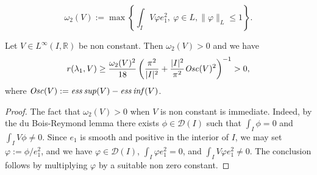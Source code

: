 \documentclass[10pt,a4paper]{amsart}
\newcommand{\R}{\mathbb{R}}
\begin{document}
\begin{equation}\label{eq:defomega2}
	\omega_2(V) := \max \left\{\int_I V\varphi e_1^2,\ \varphi \in L,
	\|\varphi\|_L \leq 1\right\}.
\end{equation}

\begin{prop}\label{prop:v1} 
Let $V \in L^\infty(I,\R)$ be non constant. Then $\omega_2(V) > 0$ and we have  
\begin{equation}\label{eq:prop1}
r(\lambda_1, V) \geq \frac{\omega_2(V)^2}{18} 
\left( \frac{\pi^2}{|I|^2} + \frac{|I|^2}{\pi^2} {\it Osc}(V)^2\right)^{-1} > 0,
\end{equation}
where ${\it Osc}(V) := {\it ess\,sup}(V) - {\it ess\,inf}(V)$.
\end{prop}

\begin{proof}
The fact that $\omega_2(V) > 0$ when $V$ is non constant is immediate.
Indeed, by the du Bois-Reymond lemma there exists 
$\phi \in \mathcal{D}(I)$ such that $\int_I \phi = 0$ and $\int_I
V \phi \neq 0.$ Since $e_1$ is smooth and positive in the interior of
$I$, we may set $\varphi := \phi / e_1^2$, and we have $\varphi \in
\mathcal{D}(I)$, $\int_I \varphi e_1^2 = 0$, and $\int_I
V \varphi e_1^2 \neq 0.$ The conclusion follows by multiplying
$\varphi$ by a suitable non zero constant. 


\end{proof}
\end{document}

